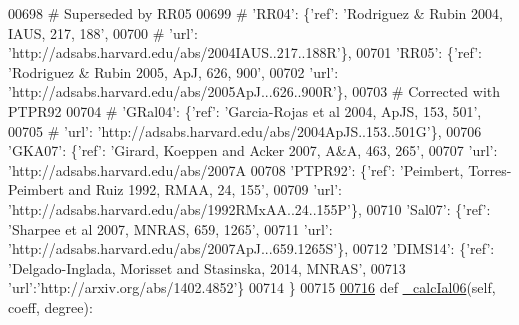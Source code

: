 \begin{DoxyCode}
{{00698 \textcolor{comment}{# Superseded by RR05}
00699 \textcolor{comment}{#                             'RR04': \{'ref': 'Rodriguez & Rubin 2004, IAUS, 217, 188',}
00700 \textcolor{comment}{#                                      'url': 'http://adsabs.harvard.edu/abs/2004IAUS..217..188R'\},}
00701                              \textcolor{stringliteral}{'RR05'}: \{\textcolor{stringliteral}{'ref'}: \textcolor{stringliteral}{'Rodriguez & Rubin 2005, ApJ, 626, 900'},
00702                                       \textcolor{stringliteral}{'url'}: \textcolor{stringliteral}{'http://adsabs.harvard.edu/abs/2005ApJ...626..900R'}\},
00703 \textcolor{comment}{# Corrected with PTPR92}
00704 \textcolor{comment}{#                             'GRal04': \{'ref': 'Garcia-Rojas et al 2004, ApJS, 153, 501',}
00705 \textcolor{comment}{#                                      'url': 'http://adsabs.harvard.edu/abs/2004ApJS..153..501G'\},}
00706                              \textcolor{stringliteral}{'GKA07'}: \{\textcolor{stringliteral}{'ref'}: \textcolor{stringliteral}{'Girard, Koeppen and Acker 2007, A&A, 463, 265'},
00707                                       \textcolor{stringliteral}{'url'}: \textcolor{stringliteral}{'http://adsabs.harvard.edu/abs/2007A%
00708                              \textcolor{stringliteral}{'PTPR92'}: \{\textcolor{stringliteral}{'ref'}: \textcolor{stringliteral}{'Peimbert, Torres-Peimbert and Ruiz 1992, RMAA, 24, 155'},
00709                                         \textcolor{stringliteral}{'url'}: \textcolor{stringliteral}{'http://adsabs.harvard.edu/abs/1992RMxAA..24..155P'}\},
00710                              \textcolor{stringliteral}{'Sal07'}: \{\textcolor{stringliteral}{'ref'}: \textcolor{stringliteral}{'Sharpee et al 2007, MNRAS, 659, 1265'},
00711                                         \textcolor{stringliteral}{'url'}: \textcolor{stringliteral}{'http://adsabs.harvard.edu/abs/2007ApJ...659.1265S'}\},
00712                              \textcolor{stringliteral}{'DIMS14'}: \{\textcolor{stringliteral}{'ref'}: \textcolor{stringliteral}{'Delgado-Inglada, Morisset and Stasinska, 2014, MNRAS'},
00713                                         \textcolor{stringliteral}{'url'}:\textcolor{stringliteral}{'http://arxiv.org/abs/1402.4852'}\}
00714                              \}
00715 
\hypertarget{icf_8py_source_l00716}{}\hyperlink{classpyneb_1_1core_1_1icf_1_1_i_c_f_a985320521114915c449f464ee3c62ceb}{00716}     \textcolor{keyword}{def }\hyperlink{classpyneb_1_1core_1_1icf_1_1_i_c_f_a985320521114915c449f464ee3c62ceb}{\_calcIal06}(self, coeff, degree):
}}}
\end{DoxyCode}
